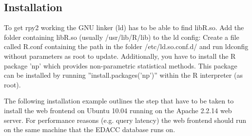 \subsection{Installation}
\label{wf:installation}
To get rpy2 working the GNU linker (ld) has to be able to find libR.so. Add the folder containing
libR.so (usually /usr/lib/R/lib) to the ld config: Create a file called R.conf containing the
path in the folder /etc/ld.so.conf.d/ and run ldconfig without parameters as root to update.
Additionally, you have to install the R package 'np' which provides non-parametric statistical
methods. This package can be installed by running ''install.packages('np')'' within the R interpreter (as root).

The following installation example outlines the step that have to be taken to install the web frontend on Ubuntu 10.04
running on the Apache 2.2.14 web server. For performance reasons (e.g. query latency) the web frontend should run on the
same machine that the EDACC database runs on.
\marginlabel{\Eexample}
